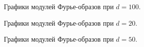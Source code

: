 \documentclass[a5paper, 10pt]{article}
\theoremstyle{definition}
\theoremstyle{plain}
\theoremstyle{remark}
\begin{document}
\begin{figure}[h!]
\caption{Графики модулей Фурье-образов при $d=100$.}
\end{figure}

\begin{figure}[h!]
\caption{Графики модулей Фурье-образов при $d=20$.}
\caption{Графики модулей Фурье-образов при $d=50$.}
\end{figure}
\end{document}
